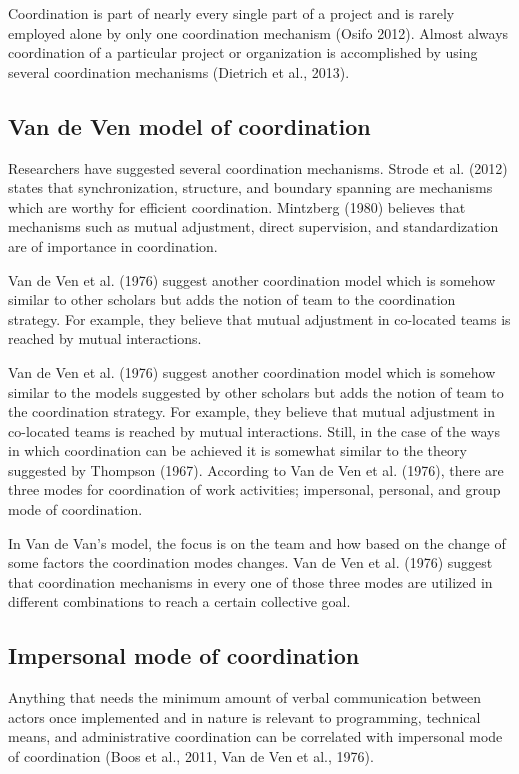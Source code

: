 Coordination is part of nearly every single part of a project and is rarely employed alone by only one coordination mechanism (Osifo 2012). Almost always coordination of a particular project or organization is accomplished by using several coordination mechanisms (Dietrich et al., 2013).

\subsection{Van de Ven model of coordination}
Researchers have suggested several coordination mechanisms. Strode et al. (2012) states that synchronization, structure, and boundary spanning are mechanisms which are worthy for efficient coordination. Mintzberg (1980) believes that mechanisms such as mutual adjustment, direct supervision, and standardization are of importance in coordination.

Van de Ven et al. (1976) suggest another coordination model which is somehow similar to other scholars but adds the notion of team to the coordination strategy. For example, they believe that mutual adjustment in co-located teams is reached by mutual interactions.

Van de Ven et al. (1976) suggest another coordination model which is somehow similar to the models suggested by other scholars but adds the notion of team to the coordination strategy. For example, they believe that mutual adjustment in co-located teams is reached by mutual interactions.
Still, in the case of the ways in which coordination can be achieved it is somewhat similar to the theory suggested by  Thompson (1967). According to Van de Ven et al. (1976), there are three modes for coordination of work activities; impersonal, personal, and group mode of coordination.

In Van de Van's model, the focus is on the team and how based on the change of some factors the coordination modes changes. Van de Ven et al. (1976) suggest that coordination mechanisms in every one of those three modes are utilized in different combinations to reach a certain collective goal.

\subsection{Impersonal mode of coordination}
Anything that needs the minimum amount of verbal communication between actors once implemented and in nature is relevant to programming, technical means, and administrative coordination can be correlated with impersonal mode of coordination (Boos et al., 2011, Van de Ven et al., 1976). 

